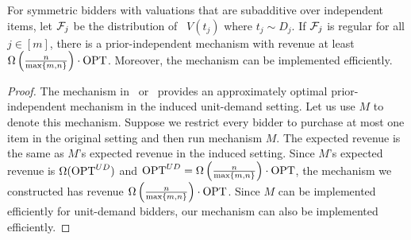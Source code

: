 \begin{theorem}\label{thm:subadditive regular}
	For symmetric bidders with valuations that are subadditive over independent items, let ${\mathcal{F}}_j$ be the distribution of ~$V(t_j)$ where $t_j\sim D_j$. If ${\mathcal{F}}_j$ is regular for all $j\in[m]$, there is a prior-independent mechanism with revenue at least $\Omega\left(\frac{n}{{\max\{m,n\}}}\right)\cdot \text{OPT}$. Moreover, the mechanism can be implemented efficiently.%
\end{theorem}
\begin{proof}
	The mechanism in~\cite{DevanurHKN11} or~\cite{RoughgardenTY12} provides an approximately optimal prior-independent mechanism in the induced unit-demand setting. Let us use $M$ to denote this mechanism. Suppose we restrict every bidder to purchase at most one item in the original setting and then run mechanism $M$. The expected revenue is the same as $M$'s expected revenue in the induced setting. Since $M$'s expected revenue is  $\Omega(\text{OPT}^{UD})$ and $\text{OPT}^{UD}=\Omega\left(\frac{n}{{\max\{m,n\}}}\right)\cdot \text{OPT}$, the mechanism we constructed has revenue $\Omega\left(\frac{n}{{\max\{m,n\}}}\right)\cdot \text{OPT}$. Since $M$ can be implemented efficiently for unit-demand bidders, our mechanism can also be implemented efficiently.\end{proof}
